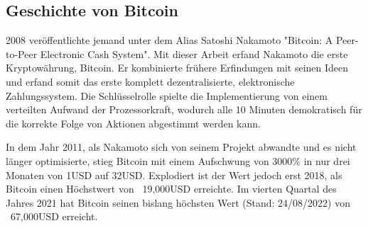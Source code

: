\subsection{Geschichte von Bitcoin}
2008 veröffentlichte jemand unter dem Alias Satoshi Nakamoto "Bitcoin: A Peer-to-Peer Electronic Cash System". \cite[Vgl.]{nakamoto}
Mit dieser Arbeit erfand Nakamoto die erste Kryptowährung, Bitcoin. Er kombinierte frühere Erfindungen mit seinen Ideen und 
erfand somit das erste komplett dezentralisierte, elektronische Zahlungssystem. Die Schlüsselrolle spielte die Implementierung 
von einem verteilten Aufwand der Prozessorkraft, wodurch alle 10 Minuten demokratisch für die korrekte Folge von Aktionen 
abgestimmt werden kann.

In dem Jahr 2011, als Nakamoto sich von seinem Projekt abwandte und es nicht länger optimisierte, stieg Bitcoin mit einem
Aufschwung von 3000\% in nur drei Monaten von 1USD auf 32USD. Explodiert ist der Wert jedoch erst 2018, als Bitcoin einen
Höchstwert von ~19,000USD erreichte. Im vierten Quartal des Jahres 2021 hat Bitcoin seinen bislang höchsten Wert (Stand: 24/08/2022)
von ~67,000USD erreicht.